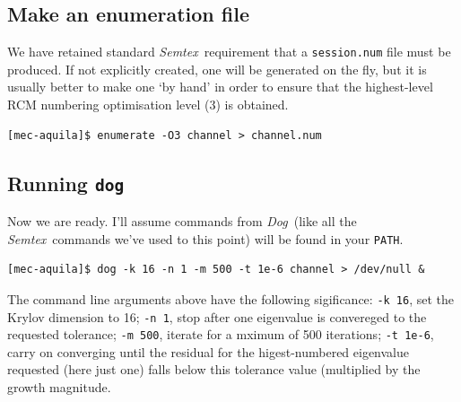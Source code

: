 \documentclass[11pt,a4paper]{report}
\newcommand{\Semtex}{\emph{Semtex}}
\newcommand{\Dog}{\emph{Dog}}
\begin{document}
\subsection{Make an enumeration file}

We have retained standard \Semtex\ requirement that a
\verb+session.num+ file must be produced. If not explicitly created,
one will be generated on the fly, but it is usually better to make one
`by hand' in order to ensure that the highest-level RCM numbering
optimisation level (3) is obtained.
{\small
\begin{verbatim}
[mec-aquila]$ enumerate -O3 channel > channel.num
\end{verbatim}
}


\subsection{Running \texttt{dog}}

Now we are ready. I'll assume commands from \Dog\ (like all the
\Semtex\ commands we've used to this point) will be found in your
\texttt{PATH}.
{\small
\begin{verbatim}
[mec-aquila]$ dog -k 16 -n 1 -m 500 -t 1e-6 channel > /dev/null &
\end{verbatim}
}The command line arguments above have the following sigificance:
\verb+-k 16+, set the Krylov dimension to 16; \verb+-n 1+, stop after
one eigenvalue is convereged to the requested tolerance;
\verb+-m 500+, iterate for a mximum of 500 iterations; \verb+-t 1e-6+,
carry on converging until the residual for the higest-numbered
eigenvalue requested (here just one) falls below this tolerance value
(multiplied by the growth magnitude.
\end{document}
